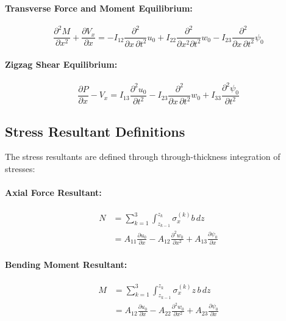 \documentclass[12pt,a4paper]{report}
\begin{document}
\paragraph{Transverse Force and Moment Equilibrium:}
\begin{equation}
\frac{\partial^2 M}{\partial x^2} + \frac{\partial V_x}{\partial x} 
= -I_{12} \frac{\partial^2}{\partial x \, \partial t^2} u_0 
+ I_{22} \frac{\partial^2}{\partial x^2 \partial t^2} w_0 
- I_{23} \frac{\partial^2}{\partial x \, \partial t^2} \psi_0
\end{equation}

\paragraph{Zigzag Shear Equilibrium:}
\begin{equation}
\frac{\partial P}{\partial x} - V_x 
= I_{13} \frac{\partial^2 u_0}{\partial t^2} 
- I_{23} \frac{\partial^2}{\partial x \, \partial t^2} w_0 
+ I_{33} \frac{\partial^2 \psi_0}{\partial t^2}
\end{equation}

\subsection*{Stress Resultant Definitions}

The stress resultants are defined through through-thickness integration of stresses:

\paragraph{Axial Force Resultant:}
\begin{align}
N &= \sum_{k=1}^{3} \int_{z_{k-1}}^{z_k} \sigma_x^{(k)} b \, dz \nonumber \\
  &= A_{11} \frac{\partial u_0}{\partial x} 
   - A_{12} \frac{\partial^2 w_0}{\partial x^2} 
   + A_{13} \frac{\partial \psi_0}{\partial x}
\end{align}

\paragraph{Bending Moment Resultant:}
\begin{align}
M &= \sum_{k=1}^{3} \int_{z_{k-1}}^{z_k} \sigma_x^{(k)} z \, b \, dz \nonumber \\
  &= A_{12} \frac{\partial u_0}{\partial x} 
   - A_{22} \frac{\partial^2 w_0}{\partial x^2} 
   + A_{23} \frac{\partial \psi_0}{\partial x}
\end{align}
\end{document}
